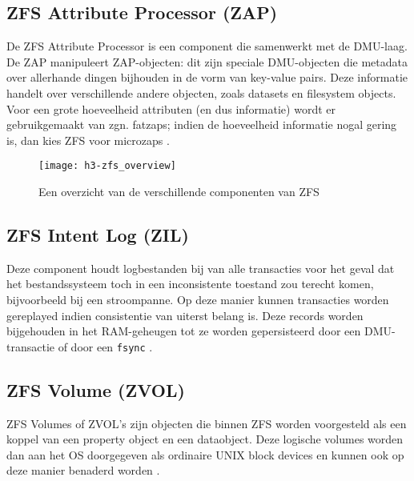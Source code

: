 \subsection{ZFS Attribute Processor (ZAP)}

De ZFS Attribute Processor is een component die samenwerkt met de DMU-laag. De ZAP manipuleert ZAP-objecten: dit zijn speciale DMU-objecten die metadata over allerhande dingen bijhouden in de vorm van key-value pairs. Deze informatie handelt over verschillende andere objecten, zoals datasets en filesystem objects. Voor een grote hoeveelheid attributen (en dus informatie) wordt er gebruikgemaakt van zgn. fatzaps; indien de hoeveelheid informatie nogal gering is, dan kies ZFS voor microzaps \autocite{Microsystems2006}.

\begin{figure}
        \centering
        \texttt{[image: h3-zfs\_overview]}
        \caption{Een overzicht van de verschillende componenten van ZFS \autocite{KendiOnbekend}}
        \label{fig:kendi_zfs_overview}
\end{figure}

\subsection{ZFS Intent Log (ZIL)}

Deze component houdt logbestanden bij van alle transacties voor het geval dat het bestandssysteem toch in een inconsistente toestand zou terecht komen, bijvoorbeeld bij een stroompanne. Op deze manier kunnen transacties worden gereplayed indien consistentie van uiterst belang is. Deze records worden bijgehouden in het RAM-geheugen tot ze worden gepersisteerd door een DMU-transactie of door een \texttt{fsync} \autocite{ZFSBonwick}. 

\subsection{ZFS Volume (ZVOL)}

ZFS Volumes of ZVOL's zijn objecten die binnen ZFS worden voorgesteld als een koppel van een property object en een dataobject. Deze logische volumes worden dan aan het OS doorgegeven als ordinaire UNIX block devices en kunnen ook op deze manier benaderd worden \autocite{Microsystems2006}.
